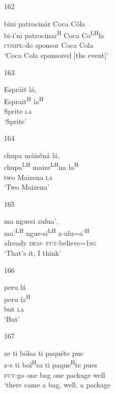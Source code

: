 \begin{itemize}
\item[162]
 
\glll  bini patrocin\'{a}r Coca C\v{o}la \\
bi-i'ni patrocinar\textsuperscript{H} Coca Co\textsuperscript{LH}la \\
\textsc{compl}-do sponsor Coca Cola \\
\glt `Coca Cola sponsored [the event]'
 


\item[163]
 
\glll   Espr\'{a}it l\'{a}, \\
 Esprait\textsuperscript{H} la\textsuperscript{H} \\
Sprite \textsc{la} \\
\glt `Sprite'
 


\item[164]
 
\glll   chupa m\'{a}iz\v{e}n\'{a} l\'{a}, \\
chupa\textsuperscript{LH} maize\textsuperscript{LH}na la\textsuperscript{H} \\
two Maizena \textsc{la} \\
\glt `Two Maizena'
 


\item[165]
 
\glll   ma nguesi zulua', \\
 ma'\textsuperscript{LH} ngue-si\textsuperscript{LH}  z-ulu=a'\textsuperscript{H} \\
already \textsc{dem}- \textsc{fut}-believe=\textsc{1sg} \\
\glt `That's it, I think'
 


\item[166]
 
\glll   peru l\'{a} \\
peru la\textsuperscript{H} \\
but \textsc{la} \\
\glt `But'
 


\item[167]
 
\glll  ze ti b\'{o}lsa ti paqu\'{e}te pue \\
z-e ti bol\textsuperscript{H}sa ti paque\textsuperscript{H}te pues \\
\textsc{fut}-go one bag one package well  \\
\glt `there came a bag, well, a package
 




\end{itemize}
